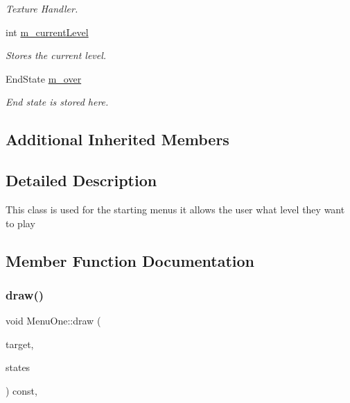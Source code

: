 \begin{DoxyCompactItemize}
\begin{DoxyCompactList}\small\item\em Texture Handler. \end{DoxyCompactList}\item 
\mbox{\label{class_menu_one_ab8b2c807616861d67f442b7757012479}} 
int \mbox{\hyperlink{class_menu_one_ab8b2c807616861d67f442b7757012479}{m\+\_\+current\+Level}}
\begin{DoxyCompactList}\small\item\em Stores the current level. \end{DoxyCompactList}\item 
\mbox{\label{class_menu_one_a7b8b398cbbcd5702c7fa27a5546d0ca1}} 
End\+State \mbox{\hyperlink{class_menu_one_a7b8b398cbbcd5702c7fa27a5546d0ca1}{m\+\_\+over}}
\begin{DoxyCompactList}\small\item\em End state is stored here. \end{DoxyCompactList}\end{DoxyCompactItemize}
\subsection*{Additional Inherited Members}


\subsection{Detailed Description}
This class is used for the starting menu\textquotesingle{}s it allows the user what level they want to play 

\subsection{Member Function Documentation}
\mbox{\label{class_menu_one_a861529b6fcc30daebc753186714e3cc9}} 
\subsubsection{\texorpdfstring{draw()}{draw()}}
{\footnotesize\ttfamily void Menu\+One\+::draw (\begin{DoxyParamCaption}\item[{sf\+::\+Render\+Target \&}]{target,  }\item[{sf\+::\+Render\+States}]{states }\end{DoxyParamCaption}) const\hspace{0.3cm}{\ttfamily [override]}, {\ttfamily [virtual]}}



